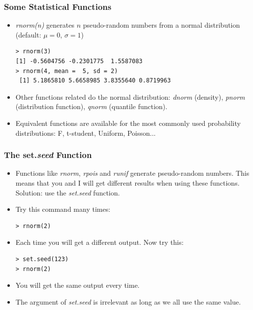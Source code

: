 \documentclass[xcolor=dvipsnames, xcolor=table]{beamer} %
\theoremstyle{mystyle}
\begin{document}
\begin{frame}[fragile]
\frametitle{Some Statistical Functions}
\begin{itemize}
\item \textit{rnorm(n)} generates $n$ pseudo-random numbers from a normal distribution (default: $\mu = 0$, $\sigma = 1$)

\begin{verbatim}
> rnorm(3)
[1] -0.5604756 -0.2301775  1.5587083
> rnorm(4, mean =  5, sd = 2)
 [1] 5.1865810 5.6658985 3.8355640 0.8719963 
\end{verbatim}

\item  Other functions related do the normal distribution: \textit{dnorm} (density), \textit{pnorm} (distribution function), \textit{qnorm} (quantile function).
\item Equivalent functions are available for the most commonly used probability distributions: F, t-student, Uniform, Poisson...
\end{itemize}

\end{frame}

\begin{frame}[fragile]
\frametitle{The set.\textit{seed} Function}
\begin{itemize}
\item  Functions like \textit{rnorm}, \textit{rpois} and \textit{runif} generate pseudo-random numbers. This means that you and I will get different results when using these functions. Solution: use the \textit{set.seed} function.
\item Try this command many times: 

\begin{verbatim}
> rnorm(2) 
\end{verbatim}

\item Each time you will get a different output. Now try this:

\begin{verbatim}
> set.seed(123)
> rnorm(2)
\end{verbatim}

\item You will get the  same output every time.
\item The argument of \textit{set.seed} is irrelevant as long as we all use the same value.
\end{itemize}

\end{frame}
\end{document}
